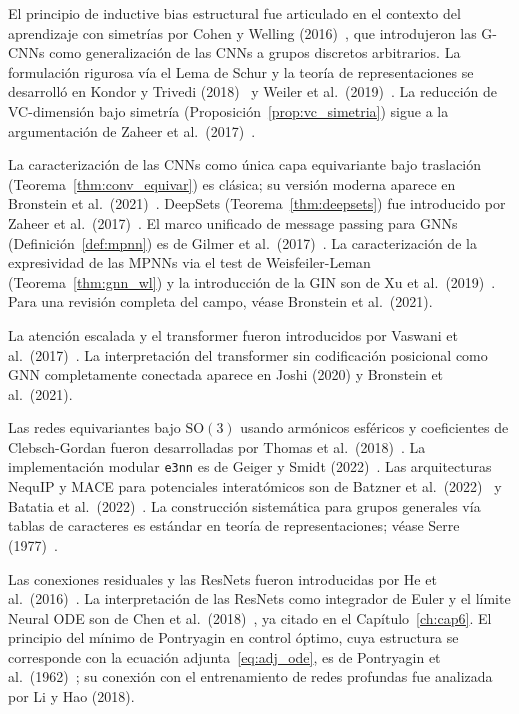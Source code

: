 \begin{notasbib}
El principio de inductive bias estructural fue articulado en el contexto del
aprendizaje con simetrías por Cohen y Welling (2016)~\cite{cohen2016group}, que
introdujeron las G-CNNs como generalización de las CNNs a grupos discretos
arbitrarios. La formulación rigurosa vía el Lema de Schur y la teoría de
representaciones se desarrolló en Kondor y Trivedi (2018)~\cite{kondor2018clebsch}
y Weiler et al.\ (2019)~\cite{weiler2019general}. La reducción de
VC-dimensión bajo simetría (Proposición~\ref{prop:vc_simetria}) sigue a
la argumentación de Zaheer et al.\ (2017)~\cite{zaheer2017deep}.

La caracterización de las CNNs como única capa equivariante bajo traslación
(Teorema~\ref{thm:conv_equivar}) es clásica; su versión moderna aparece en
Bronstein et al.\ (2021)~\cite{bronstein2021geometric}. DeepSets
(Teorema~\ref{thm:deepsets}) fue introducido por Zaheer et al.\
(2017)~\cite{zaheer2017deep}. El marco unificado de message passing para GNNs
(Definición~\ref{def:mpnn}) es de Gilmer et al.\ (2017)~\cite{gilmer2017neural}.
La caracterización de la expresividad de las MPNNs via el test de
Weisfeiler-Leman (Teorema~\ref{thm:gnn_wl}) y la introducción de la GIN son de
Xu et al.\ (2019)~\cite{xu2019powerful}. Para una revisión completa del campo,
véase Bronstein et al.\ (2021).

La atención escalada y el transformer fueron introducidos por Vaswani et al.\
(2017)~\cite{vaswani2017attention}. La interpretación del transformer sin
codificación posicional como GNN completamente conectada aparece en Joshi
(2020) y Bronstein et al.\ (2021).

Las redes equivariantes bajo $\mathrm{SO}(3)$ usando armónicos esféricos y
coeficientes de Clebsch-Gordan fueron desarrolladas por Thomas et al.\
(2018)~\cite{thomas2018tensor}. La implementación modular \texttt{e3nn} es de
Geiger y Smidt (2022)~\cite{geiger2022e3nn}. Las arquitecturas NequIP y MACE
para potenciales interatómicos son de Batzner et al.\
(2022)~\cite{batzner2022nequip} y Batatia et al.\
(2022)~\cite{batatia2022mace}. La construcción sistemática para grupos generales
vía tablas de caracteres es estándar en teoría de representaciones; véase Serre
(1977)~\cite{serre1977linear}.

Las conexiones residuales y las ResNets fueron introducidas por He et al.\
(2016)~\cite{he2016deep}. La interpretación de las ResNets como integrador de
Euler y el límite Neural ODE son de Chen et al.\
(2018)~\cite{chen2018neural}, ya citado en el Capítulo~\ref{ch:cap6}. El
principio del mínimo de Pontryagin en control óptimo, cuya estructura se
corresponde con la ecuación adjunta~\eqref{eq:adj_ode}, es de Pontryagin et al.\
(1962)~\cite{pontryagin1962mathematical}; su conexión con el entrenamiento de
redes profundas fue analizada por Li y Hao (2018).
\end{notasbib}

